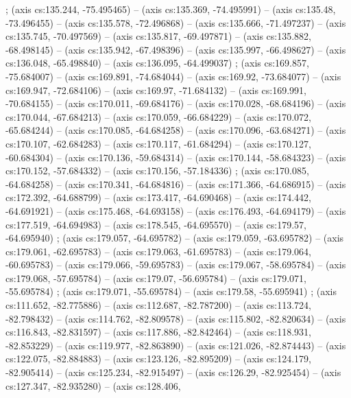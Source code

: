  ;  (axis cs:135.244, -75.495465) -- (axis
  cs:135.369, -74.495991) -- (axis cs:135.48, -73.496455) -- (axis cs:135.578,
  -72.496868) -- (axis cs:135.666, -71.497237) -- (axis cs:135.745,
  -70.497569) -- (axis cs:135.817, -69.497871) -- (axis cs:135.882,
  -68.498145) -- (axis cs:135.942, -67.498396) -- (axis cs:135.997,
  -66.498627) -- (axis cs:136.048, -65.498840) -- (axis cs:136.095,
  -64.499037) ;  (axis cs:169.857, -75.684007) --
  (axis cs:169.891, -74.684044) -- (axis cs:169.92, -73.684077) -- (axis
  cs:169.947, -72.684106) -- (axis cs:169.97, -71.684132) -- (axis cs:169.991,
  -70.684155) -- (axis cs:170.011, -69.684176) -- (axis cs:170.028,
  -68.684196) -- (axis cs:170.044, -67.684213) -- (axis cs:170.059,
  -66.684229) -- (axis cs:170.072, -65.684244) -- (axis cs:170.085,
  -64.684258) -- (axis cs:170.096, -63.684271) -- (axis cs:170.107,
  -62.684283) -- (axis cs:170.117, -61.684294) -- (axis cs:170.127,
  -60.684304) -- (axis cs:170.136, -59.684314) -- (axis cs:170.144,
  -58.684323) -- (axis cs:170.152, -57.684332) -- (axis cs:170.156,
  -57.184336) ;  (axis cs:170.085, -64.684258) --
  (axis cs:170.341, -64.684816) -- (axis cs:171.366, -64.686915) -- (axis
  cs:172.392, -64.688799) -- (axis cs:173.417, -64.690468) -- (axis
  cs:174.442, -64.691921) -- (axis cs:175.468, -64.693158) -- (axis
  cs:176.493, -64.694179) -- (axis cs:177.519, -64.694983) -- (axis
  cs:178.545, -64.695570) -- (axis cs:179.57, -64.695940)
  ;  (axis cs:179.057, -64.695782) -- (axis
  cs:179.059, -63.695782) -- (axis cs:179.061, -62.695783) -- (axis
  cs:179.063, -61.695783) -- (axis cs:179.064, -60.695783) -- (axis
  cs:179.066, -59.695783) -- (axis cs:179.067, -58.695784) -- (axis
  cs:179.068, -57.695784) -- (axis cs:179.07, -56.695784) -- (axis cs:179.071,
  -55.695784) ;  (axis cs:179.071, -55.695784) --
  (axis cs:179.58, -55.695941) ;  (axis
  cs:111.652, -82.775886) -- (axis cs:112.687, -82.787200) -- (axis
  cs:113.724, -82.798432) -- (axis cs:114.762, -82.809578) -- (axis
  cs:115.802, -82.820634) -- (axis cs:116.843, -82.831597) -- (axis
  cs:117.886, -82.842464) -- (axis cs:118.931, -82.853229) -- (axis
  cs:119.977, -82.863890) -- (axis cs:121.026, -82.874443) -- (axis
  cs:122.075, -82.884883) -- (axis cs:123.126, -82.895209) -- (axis
  cs:124.179, -82.905414) -- (axis cs:125.234, -82.915497) -- (axis cs:126.29,
  -82.925454) -- (axis cs:127.347, -82.935280) -- (axis cs:128.406,
